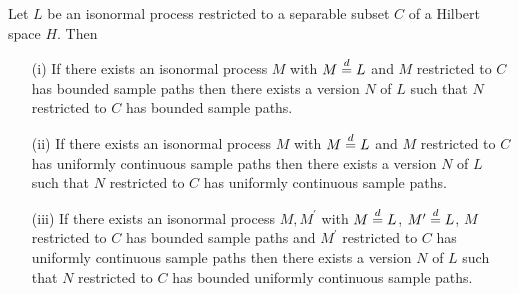 \begin{prop}\label{VersionsForIsonormal}Let $L$ be an isonormal process restricted to a separable subset $C$ of a Hilbert space $H$.  Then 
\begin{itemize}
\item[(i)] If there exists an isonormal process $M$ with $M \overset{d}= L$ and $M$ restricted to $C$ has bounded sample paths then there exists a version $N$ of $L$ such that $N$ restricted to $C$ has bounded sample paths.
\item[(ii)] If there exists an isonormal process $M$ with $M \overset{d}= L$ and $M$ restricted to $C$ has uniformly continuous sample paths then there exists a version $N$ of $L$ such that $N$ restricted to $C$ has uniformly continuous sample paths.
\item[(iii)] If there exists an isonormal process $M,M^\prime$ with $M \overset{d}= L$, $M^\prime \overset{d}= L$, $M$ restricted to $C$ has bounded sample paths and $M^\prime$ restricted to $C$ has uniformly continuous sample paths then there exists a version $N$ of $L$ such that $N$ restricted to $C$ has bounded uniformly continuous sample paths.
\end{itemize}
\end{prop}
